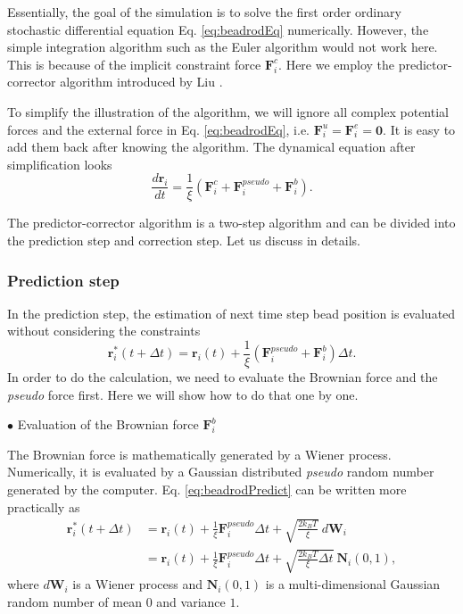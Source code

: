 Essentially, the goal of the simulation is  to solve the first order ordinary stochastic differential equation Eq. \eqref{eq:beadrodEq} numerically. However, the simple integration algorithm such as the Euler algorithm would not work here. This is because of the implicit constraint force $\mathbf{F}_i^{c}$. Here we employ the predictor-corrector algorithm introduced by Liu \cite{Liu1989}. 

To simplify the illustration of the algorithm, we will ignore all complex potential forces and the external force in Eq. \eqref{eq:beadrodEq}, i.e. $\mathbf{F}_i^{u} = \mathbf{F}_i^{e} = \mathbf{0}$. It is easy to add them back after knowing the algorithm. The dynamical equation after simplification looks 
\begin{equation}
    \label{eq:beadrodSimple}
    \frac{d \mathbf{r}_i}{d t} = \frac{1}{\xi}\left(\mathbf{F}_i^{c} + \mathbf{F}_i^{pseudo} + \mathbf{F}_i^{b}\right).
\end{equation}

The predictor-corrector algorithm is a two-step algorithm and can be divided into the prediction step and correction step. Let us discuss in details.

\subsubsection{Prediction step}
In the prediction step, the estimation of next time step bead position is evaluated without considering the constraints
\begin{equation}
    \label{eq:beadrodPredict}
    \mathbf{r}_i^*(t+\Delta t) = \mathbf{r}_i(t) + \frac{1}{\xi}(\mathbf{F}_i^{pseudo} + \mathbf{F}_i^{b})\Delta t.
\end{equation}
In order to do the calculation, we need to evaluate the Brownian force and the \emph{pseudo} force first. Here we will show how to do that one by one.

$\bullet$ Evaluation of the Brownian force $\mathbf{F}_i^{b}$

The Brownian force is mathematically generated by a Wiener process. Numerically, it is evaluated by a Gaussian distributed \emph{pseudo} random number generated by the computer. Eq. \eqref{eq:beadrodPredict} can be written more practically as 
\begin{equation}
    \begin{aligned}
    \label{eq:beadrodBrownianForce}
    \mathbf{r}_i^*(t+\Delta t) & = \mathbf{r}_i(t) + \frac{1}{\xi}\mathbf{F}_i^{pseudo}\Delta t + \sqrt{\frac{2k_B T}{\xi}}~d\mathbf{W}_i  \\
    & = \mathbf{r}_i(t) + \frac{1}{\xi}\mathbf{F}_i^{pseudo}\Delta t + \sqrt{\frac{2k_B T}{\xi} \Delta t}~\mathbf{N}_i (0, 1),
    \end{aligned}
\end{equation}
where $d\mathbf{W}_i$ is a Wiener process and $\mathbf{N}_i(0,1)$ is a multi-dimensional Gaussian random number of mean $0$ and variance $1$.

